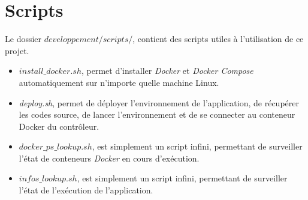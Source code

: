 \newpage
\section{Scripts}

Le dossier \emph{$developpement/scripts/$}, contient des scripts utiles à l'utilisation de ce projet.

\begin{itemize}
\item \emph{$install\_docker.sh$}, permet d'installer \emph{Docker} et \emph{Docker Compose} automatiquement sur n'importe quelle machine Linux.
\item \emph{deploy.sh}, permet de déployer l'environnement de l'application, de récupérer les codes source, de lancer l'environnement et de se connecter au conteneur Docker du contrôleur.
\item \emph{$docker\_ps\_lookup.sh$}, est simplement un script infini, permettant de surveiller l'état de conteneurs \emph{Docker} en cours d'exécution.
\item \emph{$infos\_lookup.sh$}, est simplement un script infini, permettant de surveiller l'état de l'exécution de l'application.
\end{itemize}





























